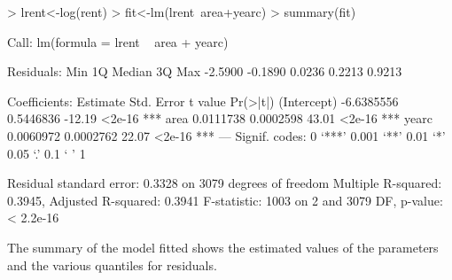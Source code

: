 \documentclass[12pt]{article}
\begin{document}
\begin{Schunk}
\begin{Sinput}
> lrent<-log(rent)
> fit<-lm(lrent~area+yearc)
> summary(fit)
\end{Sinput}
\begin{Soutput}
Call:
lm(formula = lrent ~ area + yearc)

Residuals:
    Min      1Q  Median      3Q     Max 
-2.5900 -0.1890  0.0236  0.2213  0.9213 

Coefficients:
              Estimate Std. Error t value Pr(>|t|)    
(Intercept) -6.6385556  0.5446836  -12.19   <2e-16 ***
area         0.0111738  0.0002598   43.01   <2e-16 ***
yearc        0.0060972  0.0002762   22.07   <2e-16 ***
---
Signif. codes:  0 ‘***’ 0.001 ‘**’ 0.01 ‘*’ 0.05 ‘.’ 0.1 ‘ ’ 1 

Residual standard error: 0.3328 on 3079 degrees of freedom
Multiple R-squared: 0.3945,	Adjusted R-squared: 0.3941 
F-statistic:  1003 on 2 and 3079 DF,  p-value: < 2.2e-16 
\end{Soutput}
\end{Schunk}

The summary of the model fitted shows the estimated values of the parameters and the various quantiles for residuals. 
\end{document}
